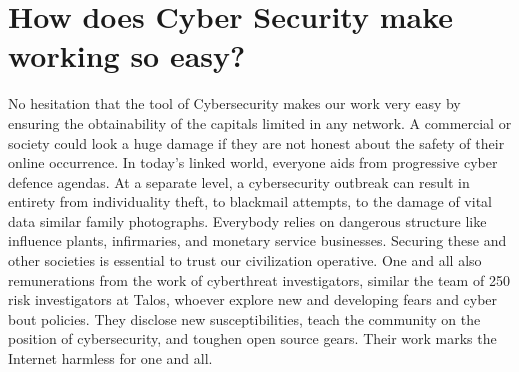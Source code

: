  \section{How does Cyber Security make working so 
easy? }
\hspace*{0.3in}No hesitation that the tool of Cybersecurity 
makes our work very easy by ensuring the 
obtainability of the capitals limited in any network. A 
commercial or society could look a huge damage if 
they are not honest about the safety of their online 
occurrence. In today’s linked world, everyone aids
from progressive cyber defence agendas. At a 
separate level, a cybersecurity outbreak can result in 
entirety from individuality theft, to blackmail 
attempts, to the damage of vital data similar family 
photographs. Everybody relies on dangerous 
structure like influence plants, infirmaries, and 
monetary service businesses. Securing these and 
other societies is essential to trust our civilization 
operative. One and all also remunerations from the 
work of cyberthreat investigators, similar the team of 
250 risk investigators at Talos, whoever explore new 
and developing fears and cyber bout policies. They 
disclose new susceptibilities, teach the community on 
the position of cybersecurity, and toughen open 
source gears. Their work marks the Internet harmless 
for one and all.
\\
